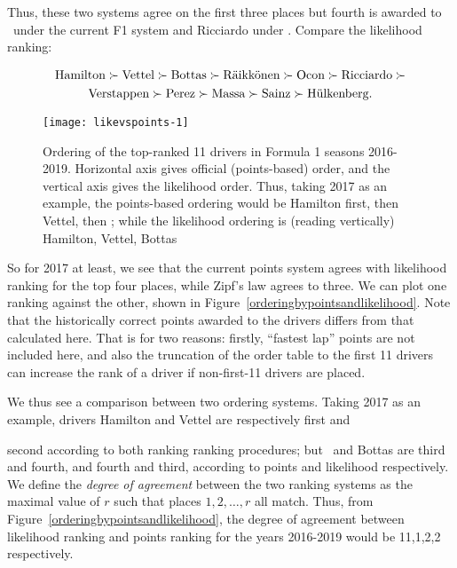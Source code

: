 \documentclass{elsarticle}
\begin{document}
\noindent Thus, these two systems agree on the first three places but
fourth is awarded to \raik\ under the current F1 system and Ricciardo
under \citeauthor{zipf1949}.  Compare the likelihood ranking:

\begin{multline}\nonumber
\mbox{Hamilton}\succ
\mbox{Vettel}\succ
\mbox{Bottas}\succ
\mbox{R\"{a}ikk\"{o}nen}\succ
\mbox{Ocon}\succ
\mbox{Ricciardo}\succ\\
\mbox{Verstappen}\succ
\mbox{Perez}\succ
\mbox{Massa}\succ
\mbox{Sainz}\succ
\mbox{H\"{u}lkenberg}.
\end{multline}

\begin{figure}
{\centering \texttt{[image: likevspoints-1]}}
\caption{\doublespacing Ordering of
  the \label{orderingbypointsandlikelihood} top-ranked 11 drivers in
  Formula 1 seasons 2016-2019.  Horizontal axis gives official
  (points-based) order, and the vertical axis gives the likelihood
  order.  Thus, taking 2017 as an example, the points-based ordering
  would be Hamilton first, then Vettel, then \raik; while the
  likelihood ordering is (reading vertically) Hamilton, Vettel, Bottas
}\label{fig:likevspoints}
\end{figure}

\noindent So for 2017 at least, we see that the current points system
agrees with likelihood ranking for the top four places, while Zipf's
law agrees to three.  We can plot one ranking against the other, shown
in Figure~\ref{orderingbypointsandlikelihood}.  Note that the
historically correct points awarded to the drivers differs from that
calculated here.  That is for two reasons: firstly, ``fastest lap''
points are not included here, and also the truncation of the order
table to the first 11 drivers can increase the rank of a driver if
non-first-11 drivers are placed.

We thus see a comparison between two ordering systems.  Taking 2017 as
an example, drivers Hamilton and Vettel are respectively first and

second according to both ranking ranking procedures; but \raik\ and
Bottas are third and fourth, and fourth and third, according to points
and likelihood respectively. We define the \emph{degree of agreement}
between the two ranking systems as the maximal value of \(r\) such
that places \(1,2,\ldots, r\) all match.  Thus, from
Figure~\ref{orderingbypointsandlikelihood}, the degree of agreement
between likelihood ranking and points ranking for the years 2016-2019
would be 11,1,2,2 respectively.
\end{document}
